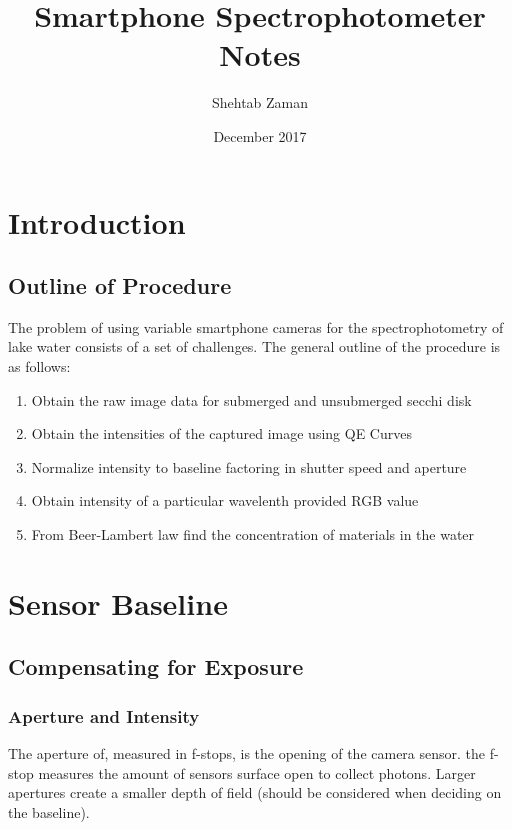 \documentclass{article}
\title{Smartphone Spectrophotometer Notes}
\author{Shehtab Zaman }
\date{December 2017}
\begin{document}
\maketitle
\section{Introduction}

\subsection{Outline of Procedure}
The problem of using variable smartphone cameras for the
spectrophotometry of lake water consists of a set of challenges.
The general outline of the procedure is as follows:
\begin{enumerate}
\item Obtain the raw image data for submerged and unsubmerged secchi disk
\item Obtain the intensities of the captured image using QE Curves
\item Normalize intensity to baseline factoring in shutter speed and aperture
\item Obtain intensity of a particular wavelenth provided RGB value
\item From Beer-Lambert law find the concentration of materials in the water
\end{enumerate}

\section{Sensor Baseline}

\subsection{Compensating for Exposure}

\subsubsection{Aperture and Intensity}

The aperture of, measured in f-stops, is the opening of the camera sensor. the
f-stop measures the amount of sensors surface open to collect photons. Larger
apertures create a smaller depth of field (should be considered when deciding on the baseline).
\end{document}
